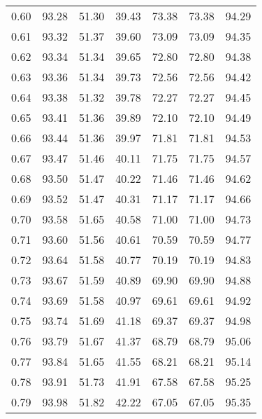 \begin{tabular}{|c|c|c|c|c|c|c|}
      0.60 &     93.28 &     51.30 &      39.43 &   73.38 &      73.38 &         94.29 \\
      0.61 &     93.32 &     51.37 &      39.60 &   73.09 &      73.09 &         94.35 \\
      0.62 &     93.34 &     51.34 &      39.65 &   72.80 &      72.80 &         94.38 \\
      0.63 &     93.36 &     51.34 &      39.73 &   72.56 &      72.56 &         94.42 \\
      0.64 &     93.38 &     51.32 &      39.78 &   72.27 &      72.27 &         94.45 \\
      0.65 &     93.41 &     51.36 &      39.89 &   72.10 &      72.10 &         94.49 \\
      0.66 &     93.44 &     51.36 &      39.97 &   71.81 &      71.81 &         94.53 \\
      0.67 &     93.47 &     51.46 &      40.11 &   71.75 &      71.75 &         94.57 \\
      0.68 &     93.50 &     51.47 &      40.22 &   71.46 &      71.46 &         94.62 \\
      0.69 &     93.52 &     51.47 &      40.31 &   71.17 &      71.17 &         94.66 \\
      0.70 &     93.58 &     51.65 &      40.58 &   71.00 &      71.00 &         94.73 \\
      0.71 &     93.60 &     51.56 &      40.61 &   70.59 &      70.59 &         94.77 \\
      0.72 &     93.64 &     51.58 &      40.77 &   70.19 &      70.19 &         94.83 \\
      0.73 &     93.67 &     51.59 &      40.89 &   69.90 &      69.90 &         94.88 \\
      0.74 &     93.69 &     51.58 &      40.97 &   69.61 &      69.61 &         94.92 \\
      0.75 &     93.74 &     51.69 &      41.18 &   69.37 &      69.37 &         94.98 \\
      0.76 &     93.79 &     51.67 &      41.37 &   68.79 &      68.79 &         95.06 \\
      0.77 &     93.84 &     51.65 &      41.55 &   68.21 &      68.21 &         95.14 \\
      0.78 &     93.91 &     51.73 &      41.91 &   67.58 &      67.58 &         95.25 \\
      0.79 &     93.98 &     51.82 &      42.22 &   67.05 &      67.05 &         95.35 \\

\end{tabular}
